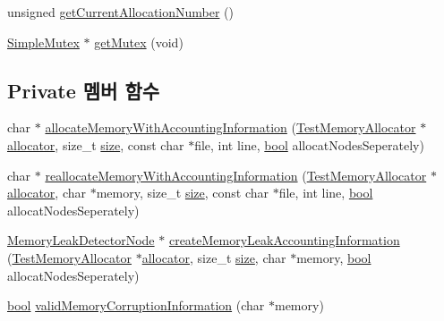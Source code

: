 \begin{DoxyCompactItemize}
\item 
unsigned \hyperlink{class_memory_leak_detector_a774a54e55a1203f145f722609ae18317}{get\+Current\+Allocation\+Number} ()
\item 
\hyperlink{class_simple_mutex}{Simple\+Mutex} $\ast$ \hyperlink{class_memory_leak_detector_a19d27cb7dd06173cc88f58543bfe3020}{get\+Mutex} (void)
\end{DoxyCompactItemize}
\subsection*{Private 멤버 함수}
\begin{DoxyCompactItemize}
\item 
char $\ast$ \hyperlink{class_memory_leak_detector_a9f85c6601d58ad9a888439e5834ae237}{allocate\+Memory\+With\+Accounting\+Information} (\hyperlink{class_test_memory_allocator}{Test\+Memory\+Allocator} $\ast$\hyperlink{_memory_leak_warning_test_8cpp_a83fc2e9b9142613f7df2bcc3ff8292bc}{allocator}, size\+\_\+t \hyperlink{gst__avb__playbin_8c_a439227feff9d7f55384e8780cfc2eb82}{size}, const char $\ast$file, int line, \hyperlink{avb__gptp_8h_af6a258d8f3ee5206d682d799316314b1}{bool} allocat\+Nodes\+Seperately)
\item 
char $\ast$ \hyperlink{class_memory_leak_detector_a862b3c60768aa68ba86dd124a658266a}{reallocate\+Memory\+With\+Accounting\+Information} (\hyperlink{class_test_memory_allocator}{Test\+Memory\+Allocator} $\ast$\hyperlink{_memory_leak_warning_test_8cpp_a83fc2e9b9142613f7df2bcc3ff8292bc}{allocator}, char $\ast$memory, size\+\_\+t \hyperlink{gst__avb__playbin_8c_a439227feff9d7f55384e8780cfc2eb82}{size}, const char $\ast$file, int line, \hyperlink{avb__gptp_8h_af6a258d8f3ee5206d682d799316314b1}{bool} allocat\+Nodes\+Seperately)
\item 
\hyperlink{struct_memory_leak_detector_node}{Memory\+Leak\+Detector\+Node} $\ast$ \hyperlink{class_memory_leak_detector_a7ee2afe61a37ef68a82228bd91643442}{create\+Memory\+Leak\+Accounting\+Information} (\hyperlink{class_test_memory_allocator}{Test\+Memory\+Allocator} $\ast$\hyperlink{_memory_leak_warning_test_8cpp_a83fc2e9b9142613f7df2bcc3ff8292bc}{allocator}, size\+\_\+t \hyperlink{gst__avb__playbin_8c_a439227feff9d7f55384e8780cfc2eb82}{size}, char $\ast$memory, \hyperlink{avb__gptp_8h_af6a258d8f3ee5206d682d799316314b1}{bool} allocat\+Nodes\+Seperately)
\item 
\hyperlink{avb__gptp_8h_af6a258d8f3ee5206d682d799316314b1}{bool} \hyperlink{class_memory_leak_detector_aeb6f1872936e5c8b25300897c8d81096}{valid\+Memory\+Corruption\+Information} (char $\ast$memory)

\end{DoxyCompactItemize}

